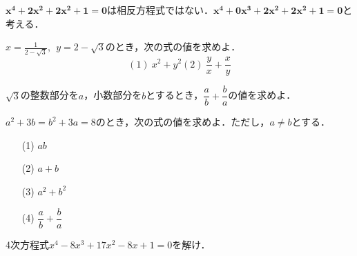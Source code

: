 \documentclass[a4paper,11pt]{ltjsarticle}
\begin{document}
　\\
　\\
\begin{rembox}
$\boldsymbol{x^4+2x^2+2x^2+1=0}$は相反方程式ではない．$\boldsymbol{x^4+0x^3+2x^2+2x^2+1=0}$と考える．
\end{rembox}
\newpage
{}
\begin{toi}
$x=\displaystyle{\frac{1}{2-\sqrt3}},~~y=\displaystyle{2-\sqrt3}$のとき，次の式の値を求めよ．
\[(1)~x^2+y^2　　　　　　(2)~\frac{y}{x}+\frac{x}{y}\]
\end{toi}
\begin{toi}
$\sqrt 3$の整数部分を$a$，小数部分を$b$とするとき，$\dfrac{a}{b}+\dfrac{b}{a}$の値を求めよ．
\end{toi}
\begin{toi}
$a^2+3b=b^2+3a=8$のとき，次の式の値を求めよ．ただし，$a\neq b$とする．\\
\begin{minipage}{0.25\linewidth}
\begin{itemize}
    \item [(1)]$ab$
\end{itemize}
\end{minipage}
\begin{minipage}{0.25\linewidth}
\begin{itemize}
    \item [(2)]$a+b$
\end{itemize}
\end{minipage}
\begin{minipage}{0.25\linewidth}
\begin{itemize}
    \item [(3)]$a^2+b^2$
\end{itemize}
\end{minipage}
\begin{minipage}{0.25\linewidth}
\begin{itemize}
    \item [(4)]$\dfrac{a}{b}+\dfrac{b}{a}$
\end{itemize}
\end{minipage}
\end{toi}
\begin{toi}
4次方程式$x^4-8x^3+17x^2-8x+1=0$を解け．\rightline{[2020~横浜市大　医]}
\end{toi}
\end{document}
